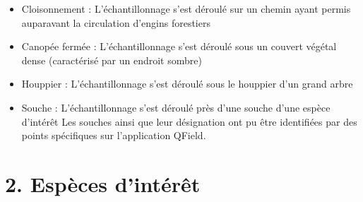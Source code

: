 \documentclass[
  
  
  
  
  ]{book}
\providecommand{\tightlist}{%
  \setlength{\itemsep}{0pt}\setlength{\parskip}{0pt}}
\begin{document}
\begin{itemize}
\tightlist
\item
  Cloisonnement : L'échantillonnage s'est déroulé sur un chemin ayant permis auparavant la circulation d'engins forestiers
\item
  Canopée fermée : L'échantillonnage s'est déroulé sous un couvert végétal dense (caractérisé par un endroit sombre)
\item
  Houppier : L'échantillonnage s'est déroulé sous le houppier d'un grand arbre
\item
  Souche : L'échantillonnage s'est déroulé près d'une souche d'une espèce d'intérêt
  Les souches ainsi que leur désignation ont pu être identifiées par des points spécifiques sur l'application QField.
\end{itemize}

\hypertarget{espuxe8ces-dintuxe9ruxeat}{%
\section{2. Espèces d'intérêt}\label{espuxe8ces-dintuxe9ruxeat}}
\end{document}
